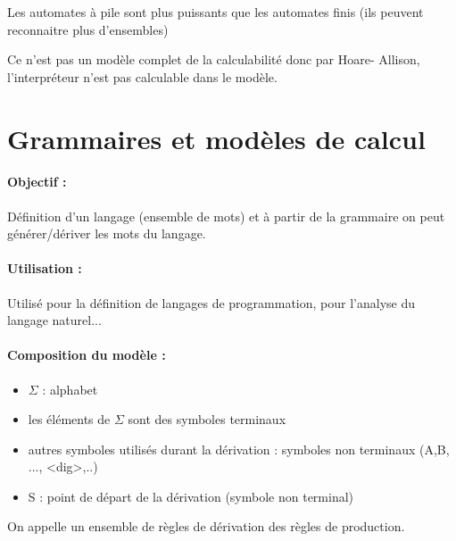 \begin{myprop}
	Les automates à pile sont plus puissants que les automates finis (ils
	peuvent reconnaitre plus d'ensembles)
\end{myprop}

\begin{myprop}
	Ce n'est pas un modèle complet de la calculabilité donc par Hoare-
	Allison, l'interpréteur n'est pas calculable dans le modèle.
\end{myprop}


\section{Grammaires et modèles de calcul}
\label{sub:grammaires_et_mod_les_de_calcul}

\paragraph{Objectif :}
Définition d'un langage (ensemble de mots) et à partir de la grammaire on peut
générer/dériver les mots du langage.

\paragraph{Utilisation :} Utilisé pour la définition de langages de
programmation, pour l'analyse du langage naturel...

\paragraph{Composition du modèle :}

\begin{itemize}
	\item $\Sigma$ : alphabet
	\item les éléments de $\Sigma$ sont des symboles terminaux
	\item autres symboles utilisés durant la dérivation : symboles non
		terminaux (A,B, ..., <dig>,..)
	\item S : point de départ de la dérivation (symbole non terminal)
\end{itemize}

\begin{mydef}
	On appelle un ensemble de règles de dérivation des règles de production.
\end{mydef}

